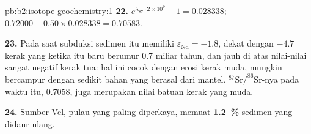 \begin{solution}{pb:b2:isotope-geochemistry:1}
\textbf{22.} $e^{\lambda_{87}\cdot2\times10^9} - 1 = 0.028338$;
$0.72000 - 0.50\times0.028338 = 0.70583$.

\textbf{23.} Pada saat subduksi sedimen itu memiliki $\varepsilon_{\mathrm{Nd}} = -1.8$, dekat dengan
$-4.7$ kerak yang ketika itu baru berumur 0.7 miliar tahun, dan jauh di atas
nilai-nilai sangat negatif kerak tua: hal ini cocok dengan erosi kerak muda, mungkin
bercampur dengan sedikit bahan yang berasal dari mantel. $^{87}\mathrm{Sr}/^{86}\mathrm{Sr}$-nya
pada waktu itu, 0.7058, juga merupakan nilai batuan kerak yang muda.

\textbf{24.} Sumber Vel, pulau yang paling diperkaya, memuat
\textbf{\qty[text-series-to-math=true]{1.2}{\percent}} sedimen yang didaur ulang.
\end{solution}
